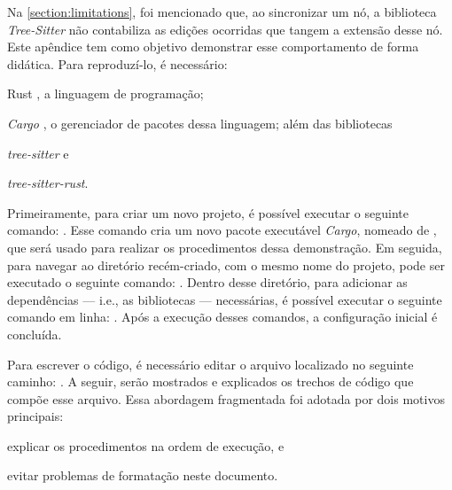 \documentclass
  [11pt,a4paper,english,brazil,openright,sumario=tradicional,twoside]
  {abntex2}
\newcommand{\treesitter}{\textit{Tree-Sitter}\xspace}
\begin{document}
\begin{apendicesenv}
{{    Na \cref{section:limitations}, foi mencionado que, ao sincronizar um nó, a
    biblioteca \treesitter não contabiliza as edições ocorridas que tangem a
    extensão desse nó. Este apêndice tem como objetivo demonstrar esse
    comportamento de forma didática. Para reproduzí-lo, é necessário:
    \begin{inparaenum}
      \item Rust \cite{rust-2023-rust}, a linguagem de programação;
      \item \textit{Cargo} \cite{rust-2023-cargo}, o gerenciador de pacotes
            dessa linguagem; além das bibliotecas
      \item \textit{tree-sitter} e
      \item \textit{tree-sitter-rust}.
    \end{inparaenum}

    Primeiramente, para criar um novo projeto, é possível executar o seguinte
    comando: . Esse comando cria
    um novo pacote executável \textit{Cargo}, nomeado de
    , que será usado para realizar os
    procedimentos dessa demonstração. Em seguida, para navegar ao diretório
    recém-criado, com o mesmo nome do projeto, pode ser executado o seguinte
    comando: . Dentro desse diretório,
    para adicionar as dependências --- i.e., as bibliotecas --- necessárias, é
    possível executar o seguinte comando em linha:
    . Após a execução
    desses comandos, a configuração inicial é concluída.

    Para escrever o código, é necessário editar o arquivo localizado no
    seguinte caminho: . A seguir, serão
    mostrados e explicados os trechos de código que compõe esse arquivo. Essa
    abordagem fragmentada foi adotada por dois motivos principais:
    \begin{inparaenum}
      \item explicar os procedimentos na ordem de execução, e
      \item evitar problemas de formatação neste documento.
    \end{inparaenum}

}}
\end{apendicesenv}
\end{document}
